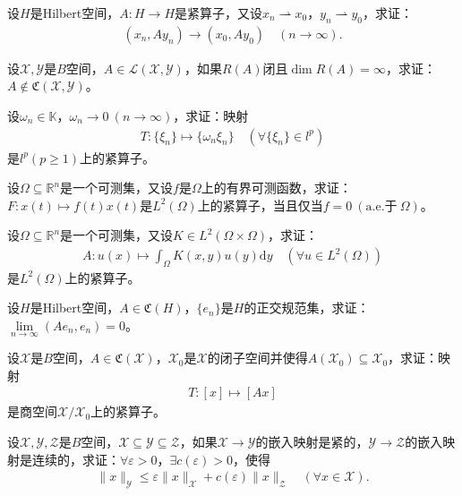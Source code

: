 \documentclass[../../main.tex]{subfiles}%
\begin{document}
\begin{example}
设$H$是Hilbert空间，$A:H\to H$是紧算子，又设$x_n\rightharpoonup x_0$，$y_n\rightharpoonup y_0$，求证：
\begin{align*}
(x_n,Ay_n)\to(x_0,Ay_0)\quad (n\to\infty).
\end{align*}
\end{example}

\begin{example}
设$\mathscr{X},\mathscr{Y}$是$B$空间，$A\in\mathscr{L}(\mathscr{X},\mathscr{Y})$，如果$R(A)$闭且$\dim R(A)=\infty$，求证：$A\notin\mathfrak{C}(\mathscr{X},\mathscr{Y})$。
\end{example}

\begin{example}
设$\omega_n\in\mathbb{K}$，$\omega_n\to0\ (n\to\infty)$，求证：映射
\begin{align*}
T:\{\xi_n\}\mapsto\{\omega_n\xi_n\}\quad (\forall\{\xi_n\}\in l^p)
\end{align*}
是$l^p(p\geqslant1)$上的紧算子。
\end{example}

\begin{example}
设$\Omega\subseteq\mathbb{R}^n$是一个可测集，又设$f$是$\Omega$上的有界可测函数，求证：$F:x(t)\mapsto f(t)x(t)$是$L^2(\Omega)$上的紧算子，当且仅当$f=0\ (\mathrm{a.e.}\text{于}\ \Omega)$。
\end{example}

\begin{example}
设$\Omega\subseteq\mathbb{R}^n$是一个可测集，又设$K\in L^2(\Omega\times\Omega)$，求证：
\begin{align*}
A:u(x)\mapsto\int_{\Omega}K(x,y)u(y)\mathrm{d}y\quad (\forall u\in L^2(\Omega))
\end{align*}
是$L^2(\Omega)$上的紧算子。
\end{example}

\begin{example}
设$H$是Hilbert空间，$A\in\mathfrak{C}(H)$，$\{e_n\}$是$H$的正交规范集，求证：$\lim\limits_{n\to\infty}(Ae_n,e_n)=0$。
\end{example}

\begin{example}
设$\mathscr{X}$是$B$空间，$A\in\mathfrak{C}(\mathscr{X})$，$\mathscr{X}_0$是$\mathscr{X}$的闭子空间并使得$A(\mathscr{X}_0)\subseteq\mathscr{X}_0$，求证：映射
\begin{align*}
T:[x]\mapsto[Ax]
\end{align*}
是商空间$\mathscr{X}/\mathscr{X}_0$上的紧算子。
\end{example}

\begin{example}
设$\mathscr{X},\mathscr{Y},\mathscr{Z}$是$B$空间，$\mathscr{X}\subseteq\mathscr{Y}\subseteq\mathscr{Z}$，如果$\mathscr{X}\to\mathscr{Y}$的嵌入映射是紧的，$\mathscr{Y}\to\mathscr{Z}$的嵌入映射是连续的，求证：$\forall\varepsilon>0$，$\exists c(\varepsilon)>0$，使得
\begin{align*}
\|x\|_{\mathscr{Y}}\leqslant\varepsilon\|x\|_{\mathscr{X}}+c(\varepsilon)\|x\|_{\mathscr{Z}}\quad (\forall x\in\mathscr{X}).
\end{align*}
\end{example}
\end{document}
